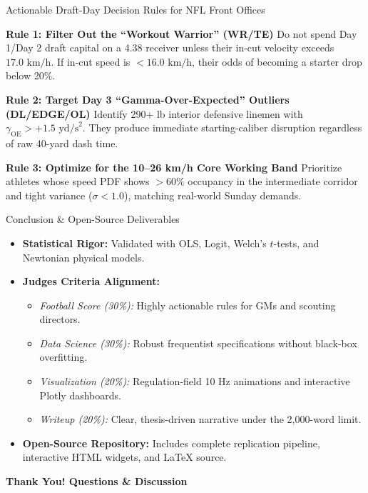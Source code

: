 \documentclass[aspectratio=169, 10pt]{beamer}
\begin{document}
\begin{frame}{Actionable Draft-Day Decision Rules for NFL Front Offices}
  \begin{block}{\textbf{Rule 1: Filter Out the ``Workout Warrior'' (WR/TE)}}
    Do not spend Day 1/Day 2 draft capital on a 4.38 receiver unless their in-cut velocity exceeds $17.0\text{ km/h}$. If in-cut speed is $<16.0\text{ km/h}$, their odds of becoming a starter drop below 20\%.
  \end{block}
  
  \begin{block}{\textbf{Rule 2: Target Day 3 ``Gamma-Over-Expected'' Outliers (DL/EDGE/OL)}}
    Identify 290+ lb interior defensive linemen with $\gamma_{\text{OE}} > +1.5\text{ yd/s}^2$. They produce immediate starting-caliber disruption regardless of raw 40-yard dash time.
  \end{block}

  \begin{block}{\textbf{Rule 3: Optimize for the 10--26 km/h Core Working Band}}
    Prioritize athletes whose speed PDF shows $>60\%$ occupancy in the intermediate corridor and tight variance ($\sigma < 1.0$), matching real-world Sunday demands.
  \end{block}
\end{frame}

\begin{frame}{Conclusion \& Open-Source Deliverables}
  \begin{itemize}
    \item \textbf{Statistical Rigor:} Validated with OLS, Logit, Welch's $t$-tests, and Newtonian physical models.
    \item \textbf{Judges Criteria Alignment:}
      \begin{itemize}
        \item \textit{Football Score (30\%):} Highly actionable rules for GMs and scouting directors.
        \item \textit{Data Science (30\%):} Robust frequentist specifications without black-box overfitting.
        \item \textit{Visualization (20\%):} Regulation-field 10 Hz animations and interactive Plotly dashboards.
        \item \textit{Writeup (20\%):} Clear, thesis-driven narrative under the 2,000-word limit.
      \end{itemize}
    \item \textbf{Open-Source Repository:} Includes complete replication pipeline, interactive HTML widgets, and LaTeX source.
  \end{itemize}
  \vspace{0.4cm}
  \begin{center}
    \textbf{Thank You! Questions \& Discussion}
  \end{center}
\end{frame}
\end{document}
